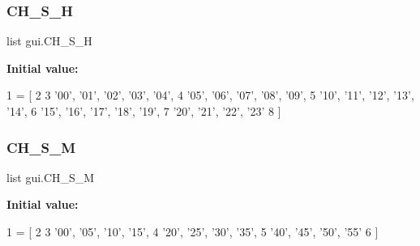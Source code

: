 \subsubsection{\texorpdfstring{C\+H\+\_\+\+S\+\_\+H}{CH\_S\_H}}
{\footnotesize\ttfamily list gui.\+C\+H\+\_\+\+S\+\_\+H}

{\bfseries Initial value\+:}
\begin{DoxyCode}
1 =  [
2     
3     \textcolor{stringliteral}{'00'}, \textcolor{stringliteral}{'01'}, \textcolor{stringliteral}{'02'}, \textcolor{stringliteral}{'03'}, \textcolor{stringliteral}{'04'}, 
4     \textcolor{stringliteral}{'05'}, \textcolor{stringliteral}{'06'}, \textcolor{stringliteral}{'07'}, \textcolor{stringliteral}{'08'}, \textcolor{stringliteral}{'09'}, 
5     \textcolor{stringliteral}{'10'}, \textcolor{stringliteral}{'11'}, \textcolor{stringliteral}{'12'}, \textcolor{stringliteral}{'13'}, \textcolor{stringliteral}{'14'}, 
6     \textcolor{stringliteral}{'15'}, \textcolor{stringliteral}{'16'}, \textcolor{stringliteral}{'17'}, \textcolor{stringliteral}{'18'}, \textcolor{stringliteral}{'19'}, 
7     \textcolor{stringliteral}{'20'}, \textcolor{stringliteral}{'21'}, \textcolor{stringliteral}{'22'}, \textcolor{stringliteral}{'23'}
8 ]
\end{DoxyCode}
\mbox{\label{namespacegui_a885a9921170bcfc77b59615b45f22786_a885a9921170bcfc77b59615b45f22786}} 
\subsubsection{\texorpdfstring{C\+H\+\_\+\+S\+\_\+M}{CH\_S\_M}}
{\footnotesize\ttfamily list gui.\+C\+H\+\_\+\+S\+\_\+M}

{\bfseries Initial value\+:}
\begin{DoxyCode}
1 =  [
2     
3     \textcolor{stringliteral}{'00'}, \textcolor{stringliteral}{'05'}, \textcolor{stringliteral}{'10'}, \textcolor{stringliteral}{'15'}, 
4     \textcolor{stringliteral}{'20'}, \textcolor{stringliteral}{'25'}, \textcolor{stringliteral}{'30'}, \textcolor{stringliteral}{'35'}, 
5     \textcolor{stringliteral}{'40'}, \textcolor{stringliteral}{'45'}, \textcolor{stringliteral}{'50'}, \textcolor{stringliteral}{'55'}
6 ]
\end{DoxyCode}
\mbox{\label{namespacegui_ae350a5f1e3a3b9bca22dd263d767f4fc_ae350a5f1e3a3b9bca22dd263d767f4fc}} 
